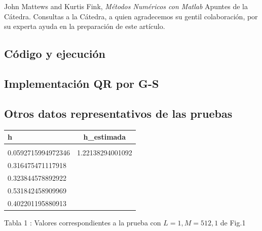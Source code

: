 \documentclass[10pt,journal,compsoc]{IEEEtran}
\begin{document}
\renewcommand{\refname}{Bibliograf\'ia}
\begin{thebibliography}{1}
John Mattews and Kurtis Fink, \emph{M\'etodos Num\'ericos con Matlab}
 Apuntes de la C\'atedra.
 Consultas a la C\'atedra, a quien agradecemos su gentil colaboraci\'on, por su experta ayuda  en la preparaci\'on de este art\'iculo.

\end{thebibliography}


\newpage

\onecolumn

\renewcommand\appendixname{Ap\'endice}

\appendix
\subsection{C\'odigo y ejecuci\'on}
 
\subsection{Implementaci\'on QR por G-S}
 
 \newpage
\subsection{Otros datos representativos de las pruebas}
 
\begin{tabular}{l c}
\hline\hline
h & h\_estimada\\
\hline \\
0.0592715994972346 & 1.22138294001092\\
0.316475471117918 &\\
0.323844578892922 &\\
0.531842458909969 &\\
0.402201195880913 &\\

\hline\hline

\end{tabular}
 
Tabla 1 : Valores correspondientes a la prueba con $L=1 , M=512, 1$ de Fig.1 \\ \\ \\
\end{document}
